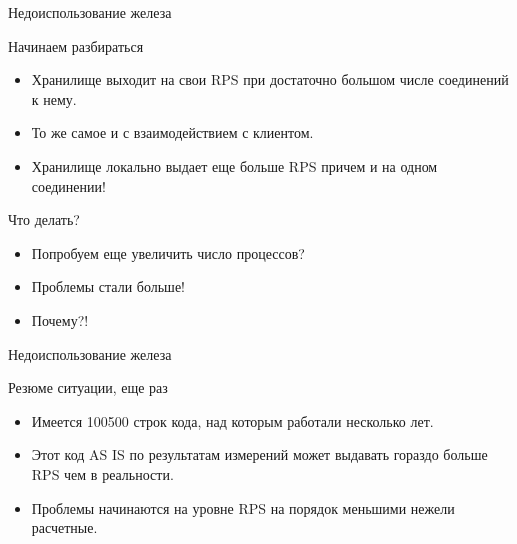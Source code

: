 \documentclass[aspectratio=169]{beamer}
\begin{document}
\begin{frame}{Недоиспользование железа}
    \begin{block}{Начинаем разбираться}
        \begin{itemize}
            \pause\item Хранилище выходит на свои RPS при достаточно большом
                числе соединений к нему.
            \pause\item То же самое и с взаимодействием с клиентом.
            \pause\item Хранилище локально выдает еще больше RPS причем и на
                одном соединении!
        \end{itemize}
    \end{block}

    \pause
    \begin{block}{Что делать?}
        \begin{itemize}
            \pause\item Попробуем еще увеличить число процессов?
            \pause\item Проблемы стали больше!
            \pause\item Почему?!
        \end{itemize}
    \end{block}
\end{frame}

\begin{frame}{Недоиспользование железа}
    \begin{block}{Резюме ситуации, еще раз}
        \begin{itemize}
            \pause\item Имеется 100500 строк кода,
                над которым работали несколько лет.

            \pause\item Этот код AS IS по результатам измерений
                может выдавать гораздо больше RPS чем в реальности.

            \pause\item Проблемы начинаются на уровне RPS на порядок меньшими
                нежели расчетные.
        \end{itemize}
    \end{block}
\end{frame}
\end{document}

